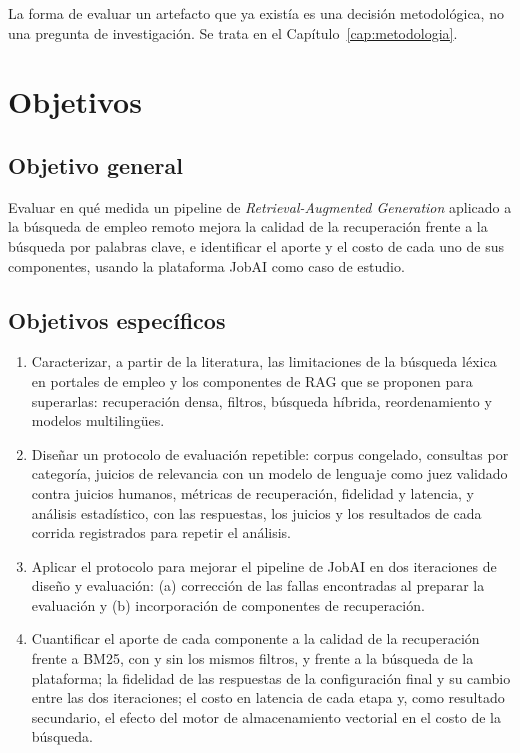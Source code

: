 La forma de evaluar un artefacto que ya existía es una decisión metodológica, no una pregunta de investigación. Se trata en el Capítulo~\ref{cap:metodologia}.

\section{Objetivos}

\subsection{Objetivo general}

Evaluar en qué medida un pipeline de \textit{Retrieval-Augmented Generation} aplicado a la búsqueda de empleo remoto mejora la calidad de la recuperación frente a la búsqueda por palabras clave, e identificar el aporte y el costo de cada uno de sus componentes, usando la plataforma JobAI como caso de estudio.

\subsection{Objetivos específicos}

\begin{enumerate}
    \item Caracterizar, a partir de la literatura, las limitaciones de la búsqueda léxica en portales de empleo y los componentes de RAG que se proponen para superarlas: recuperación densa, filtros, búsqueda híbrida, reordenamiento y modelos multilingües.
    \item Diseñar un protocolo de evaluación repetible: corpus congelado, consultas por categoría, juicios de relevancia con un modelo de lenguaje como juez validado contra juicios humanos, métricas de recuperación, fidelidad y latencia, y análisis estadístico, con las respuestas, los juicios y los resultados de cada corrida registrados para repetir el análisis.
    \item Aplicar el protocolo para mejorar el pipeline de JobAI en dos iteraciones de diseño y evaluación: (a) corrección de las fallas encontradas al preparar la evaluación y (b) incorporación de componentes de recuperación.
    \item Cuantificar el aporte de cada componente a la calidad de la recuperación frente a BM25, con y sin los mismos filtros, y frente a la búsqueda de la plataforma; la fidelidad de las respuestas de la configuración final y su cambio entre las dos iteraciones; el costo en latencia de cada etapa y, como resultado secundario, el efecto del motor de almacenamiento vectorial en el costo de la búsqueda.
\end{enumerate}

